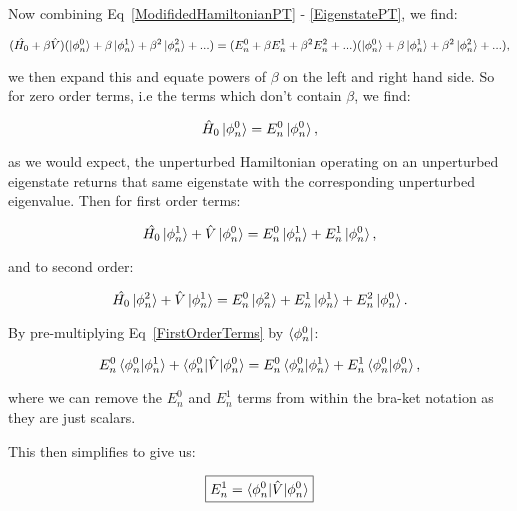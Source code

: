 \noindent Now combining Eq~\ref{ModifidedHamiltonianPT} - \ref{EigenstatePT}, we find:

\begin{equation}
    (\Hat{H_0} + \beta \Hat{V})(\ket{\phi^0_n} + \beta \ket{\phi^1_n} + \beta^2 \ket{\phi^2_n} + ...) = (E^0_n + \beta E^1_n + \beta^2 E^2_n + ...)(\ket{\phi^0_n} + \beta \ket{\phi^1_n} + \beta^2 \ket{\phi^2_n} + ...),
    \label{ExpandedHamiltonian}
\end{equation}

\noindent we then expand this and equate powers of $\beta$ on the left and right hand side. So for zero order terms, i.e the terms which don't contain $\beta$, we find:

\begin{equation}
    \Hat{H}_0 \ket{\phi^0_n} = E^0_n \ket{\phi^0_n},
    \label{ZeroOrderTerms}
\end{equation}

\noindent as we would expect, the unperturbed Hamiltonian operating on an unperturbed eigenstate returns that same eigenstate with the corresponding unperturbed eigenvalue. Then for first order terms:

\begin{equation}
    \Hat{H_0} \ket{\phi^1_n} + \Hat{V} \ket{\phi^0_n} = E^0_n \ket{\phi^1_n} + E^1_n \ket{\phi^0_n},
    \label{FirstOrderTerms}
\end{equation}

\noindent and to second order:

\begin{equation}
    \Hat{H_0} \ket{\phi^2_n} + \Hat{V} \ket{\phi^1_n} = E^0_n \ket{\phi^2_n} + E^1_n \ket{\phi^1_n} + E^2_n \ket{\phi^0_n}.
    \label{SecondOrderTerms}
\end{equation}

\noindent By pre-multiplying Eq~\ref{FirstOrderTerms} by $\bra{\phi^0_n}$:

\begin{equation}
    E^0_n \braket{\phi^0_n | \phi^1_n} + \braket{\phi^0_n | \Hat{V} | \phi^0_n} = E^0_n \braket{\phi^0_n | \phi^1_n} + E^1_n \braket{\phi^0_n | \phi^0_n},
    \label{FirstOrderMultiplied}
\end{equation}

\noindent where we can remove the $E^0_n$ and $E^1_n$ terms from within the bra-ket notation as they are just scalars.

\noindent This then simplifies to give us:

\begin{equation}
    \boxed{E^1_n = \braket{\phi^0_n | \Hat{V} | \phi^0_n}}
    \label{FirstOrderEnergyCorrection}
\end{equation}

